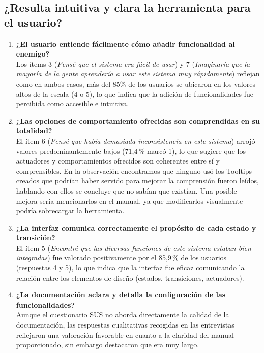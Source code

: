\subsection{¿Resulta intuitiva y clara la herramienta para el usuario?}

\begin{enumerate}
    \item \textbf{¿El usuario entiende fácilmente cómo añadir funcionalidad al enemigo?} \\
    Los ítems 3 (\textit{Pensé que el sistema era fácil de usar}) y 7 (\textit{Imaginaría que la mayoría de la gente aprendería a usar este sistema muy rápidamente}) reflejan como en ambos casos, más del 85\% de los usuarios se ubicaron en los valores altos de la escala (4 o 5), lo que indica que la adición de funcionalidades fue percibida como accesible e intuitiva. 

    \item \textbf{¿Las opciones de comportamiento ofrecidas son comprendidas en su totalidad?} \\
    El ítem 6 (\textit{Pensé que había demasiada inconsistencia en este sistema}) arrojó valores predominantemente bajos (71,4\,\% marcó 1), lo que sugiere que los actuadores y comportamientos ofrecidos son coherentes entre sí y comprensibles. En la observación encontramos que ninguno usó los Tooltips creados que podrían haber servido para mejorar la comprensión fueron leídos, hablando con ellos se concluye que no sabían  que existían. Una posible mejora sería mencionarlos en el manual, ya que modificarlos visualmente podría sobrecargar la herramienta.

    \item \textbf{¿La interfaz comunica correctamente el propósito de cada estado y transición?} \\
    El ítem 5 (\textit{Encontré que las diversas funciones de este sistema estaban bien integradas}) fue valorado positivamente por el 85,9\,\% de los usuarios (respuestas 4 y 5), lo que indica que la interfaz fue eficaz comunicando la relación entre los elementos de diseño (estados, transiciones, actuadores).

    \item \textbf{¿La documentación aclara y detalla la configuración de las funcionalidades?} \\
    Aunque el cuestionario SUS no aborda directamente la calidad de la documentación, las respuestas cualitativas recogidas en las entrevistas reflejaron una valoración favorable en cuanto a la claridad del manual proporcionado, sin embargo destacaron que era muy largo. 
\end{enumerate}

